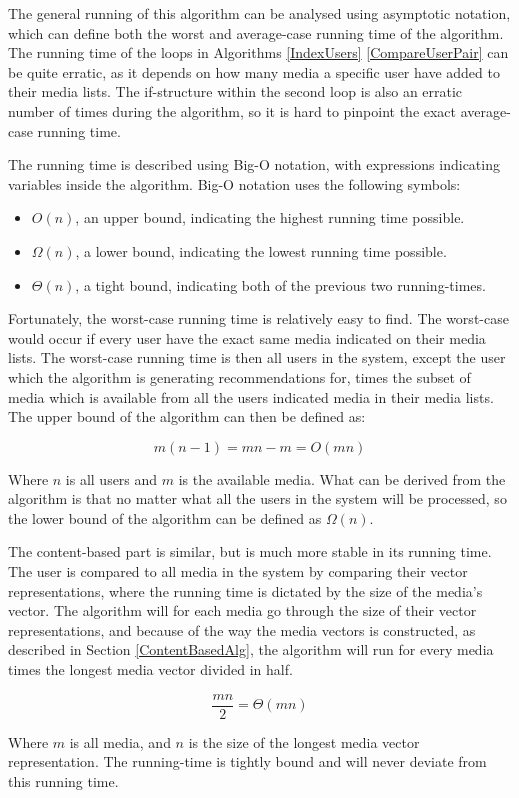 The general running of this algorithm can be analysed using asymptotic notation, which can define both the worst and average-case running time of the algorithm. The running time of the loops in Algorithms \ref{IndexUsers} \ref{CompareUserPair} can be quite erratic, as it depends on how many media a specific user have added to their media lists. The if-structure within the second loop is also an erratic number of times during the algorithm, so it is hard to pinpoint the exact average-case running time.

The running time is described using Big-O notation, with expressions indicating variables inside the algorithm. Big-O notation uses the following symbols:
\begin{itemize}
	\item $O(n)$, an upper bound, indicating the highest running time possible.
	\item $\Omega(n)$, a lower bound, indicating the lowest running time possible.
	\item $\Theta(n)$, a tight bound, indicating both of the previous two running-times.
\end{itemize}

Fortunately, the worst-case running time is relatively easy to find. The worst-case would occur if every user have the exact same media indicated on their media lists. The worst-case running time is then all users in the system, except the user which the algorithm is generating recommendations for, times the subset of media which is available from all the users indicated media in their media lists. The upper bound of the algorithm can then be defined as:

\[
m(n-1) = mn - m = O(mn)
\]

Where $n$ is all users and $m$ is the available media. What can be derived from the algorithm is that no matter what all the users in the system will be processed, so the lower bound of the algorithm can be defined as $\Omega(n)$.

The content-based part is similar, but is much more stable in its running time. The user is compared to all media in the system by comparing their vector representations, where the running time is dictated by the size of the media's vector. The algorithm will for each media go through the size of their vector representations, and because of the way the media vectors is constructed, as described in Section \ref{ContentBasedAlg}, the algorithm will run for every media times the longest media vector divided in half.

\[
\frac{mn}{2} = \Theta(mn)
\]

Where $m$ is all media, and $n$ is the size of the longest media vector representation. The running-time is tightly bound and will never deviate from this running time.